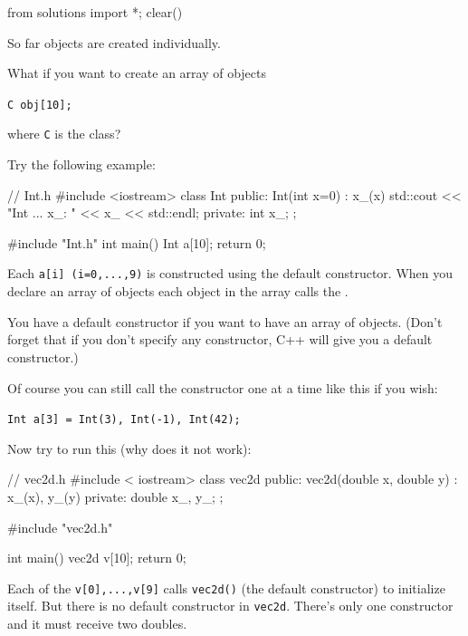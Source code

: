 \begin{python0}
from solutions import *; clear()
\end{python0}

So far objects are created individually.

What if you want to create an array of objects
\begin{center}
\texttt{C obj[10];}
\end{center}
where \texttt{C} is the class?

Try the following example:
\begin{console}
// Int.h
#include <iostream>
class Int
{     
public:
        Int(int x=0)
           : x_(x)
        {
             std::cout << "Int ... x_: " << x_
                       << std::endl;
        }
private:
        int x_;
};
\end{console}
\begin{console}
#include "Int.h"
int main()
{   
    Int a[10];
    return 0;
}
\end{console}
 Each \texttt{a[i] (i=0,...,9)} is constructed using the
default constructor. When you declare an array of objects each object in
the array calls the .

You  have a default constructor if you want to have an
array of objects. (Don't forget that if you
don't specify any constructor, C++ will give you a
default constructor.)

Of course you can still call the constructor one at a time like this if
you wish:
\begin{center}
\texttt{Int a[3] = {Int(3), Int(-1), Int(42)};}
\end{center}
Now try to run this (why does it not work):
\begin{console}
// vec2d.h
#include < iostream>
class vec2d
{
public:
        vec2d(double x, double y)
                : x_(x), y_(y)
                {}
private:
        double x_, y_;
};
\end{console}
\begin{console}
#include "vec2d.h"

int main()
{   
    vec2d v[10];
    return 0;
}
\end{console}
 Each of the \texttt{v[0],...,v[9]} calls \texttt{vec2d()}
(the default constructor) to initialize itself. But there is no default
constructor in \texttt{vec2d}. There's only one
constructor and it must receive two doubles.

